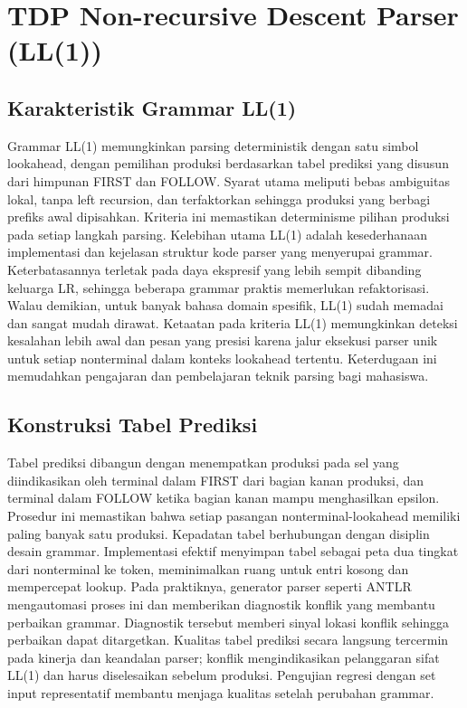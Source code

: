 \documentclass[../main.tex]{subfiles}
\begin{document}
\chapter{TDP Non-recursive Descent Parser (LL(1))}
\label{ch:ll1}

\section{Karakteristik Grammar LL(1)}
Grammar LL(1) memungkinkan parsing deterministik dengan satu simbol lookahead, dengan pemilihan produksi berdasarkan tabel prediksi yang disusun dari himpunan FIRST dan FOLLOW. Syarat utama meliputi bebas ambiguitas lokal, tanpa left recursion, dan terfaktorkan sehingga produksi yang berbagi prefiks awal dipisahkan.\cite{aho-dragon-book-2006} Kriteria ini memastikan determinisme pilihan produksi pada setiap langkah parsing.
Kelebihan utama LL(1) adalah kesederhanaan implementasi dan kejelasan struktur kode parser yang menyerupai grammar. Keterbatasannya terletak pada daya ekspresif yang lebih sempit dibanding keluarga LR, sehingga beberapa grammar praktis memerlukan refaktorisasi.\cite{grune-parsing} Walau demikian, untuk banyak bahasa domain spesifik, LL(1) sudah memadai dan sangat mudah dirawat.
Ketaatan pada kriteria LL(1) memungkinkan deteksi kesalahan lebih awal dan pesan yang presisi karena jalur eksekusi parser unik untuk setiap nonterminal dalam konteks lookahead tertentu. Keterdugaan ini memudahkan pengajaran dan pembelajaran teknik parsing bagi mahasiswa.

\section{Konstruksi Tabel Prediksi}
Tabel prediksi dibangun dengan menempatkan produksi pada sel yang diindikasikan oleh terminal dalam FIRST dari bagian kanan produksi, dan terminal dalam FOLLOW ketika bagian kanan mampu menghasilkan epsilon. Prosedur ini memastikan bahwa setiap pasangan nonterminal-lookahead memiliki paling banyak satu produksi.\cite{aho-dragon-book-2006} Kepadatan tabel berhubungan dengan disiplin desain grammar.
Implementasi efektif menyimpan tabel sebagai peta dua tingkat dari nonterminal ke token, meminimalkan ruang untuk entri kosong dan mempercepat lookup. Pada praktiknya, generator parser seperti ANTLR mengautomasi proses ini dan memberikan diagnostik konflik yang membantu perbaikan grammar.\cite{parr-antlr} Diagnostik tersebut memberi sinyal lokasi konflik sehingga perbaikan dapat ditargetkan.
Kualitas tabel prediksi secara langsung tercermin pada kinerja dan keandalan parser; konflik mengindikasikan pelanggaran sifat LL(1) dan harus diselesaikan sebelum produksi. Pengujian regresi dengan set input representatif membantu menjaga kualitas setelah perubahan grammar.

\IfSubfilesClassLoaded{%
\printbibliography
}{}
\end{document}
